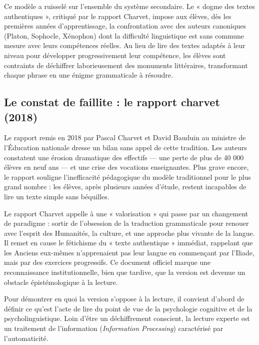 Ce modèle a ruisselé sur l'ensemble du système secondaire. Le « dogme des textes authentiques »,
critiqué par le rapport Charvet, impose aux élèves, dès les premières années d'apprentissage, la
confrontation avec des auteurs canoniques (Platon, Sophocle, Xénophon) dont la difficulté
linguistique est sans commune mesure avec leurs compétences réelles.\cite{II-3-1-ref1} Au lieu de
lire des textes adaptés à leur niveau pour développer progressivement leur compétence, les élèves
sont contraints de déchiffrer laborieusement des monuments littéraires, transformant chaque phrase
en une énigme grammaticale à résoudre.



\subsection{Le constat de faillite : le rapport charvet (2018)}

Le rapport remis en 2018 par Pascal Charvet et David Bauduin au ministre de l'Éducation nationale
dresse un bilan sans appel de cette tradition. Les auteurs constatent une érosion dramatique des
effectifs — une perte de plus de 40 000 élèves en neuf ans — et une crise des vocations
enseignantes.\cite{II-3-1-ref8} Plus grave encore, le rapport souligne l'inefficacité pédagogique du
modèle traditionnel pour le plus grand nombre : les élèves, après plusieurs années d'étude, restent
incapables de lire un texte simple sans béquilles.\cite{II-3-1-ref9}

Le rapport Charvet appelle à une « valorisation » qui passe par un changement de paradigme : sortir
de l'obsession de la traduction grammaticale pour renouer avec l'esprit des Humanités, la culture,
et une approche plus vivante de la langue. Il remet en cause le fétichisme du « texte authentique »
immédiat, rappelant que les Anciens eux-mêmes n'apprenaient pas leur langue en commençant par
l'Iliade, mais par des exercices progressifs.\cite{II-3-1-ref9} Ce document officiel marque une
reconnaissance institutionnelle, bien que tardive, que la version est devenue un obstacle
épistémologique à la lecture.

Pour démontrer en quoi la version s'oppose à la lecture, il convient d'abord de définir ce qu'est
l'acte de lire du point de vue de la psychologie cognitive et de la psycholinguistique. Loin d'être
un déchiffrement conscient, la lecture experte est un traitement de l'information
(\textit{Information Processing}) caractérisé par l'automaticité.



